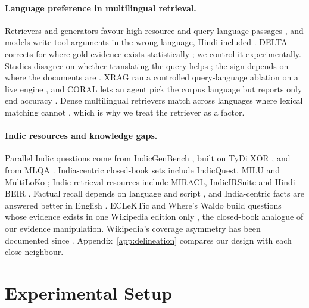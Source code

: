 \paragraph{Language preference in multilingual retrieval.} Retrievers and generators favour high-resource and query-language passages \citep{a2502_11175,a2604_20199,a2605_07249,a2509_13930}, and models write tool arguments in the wrong language, Hindi included \citep{a2601_05366}. DELTA corrects for where gold evidence exists statistically \citep{a2601_02956}; we control it experimentally. Studies disagree on whether translating the query helps \citep{a2504_03616,a2510_23070,a2507_22923}; the sign depends on where the documents are \citep{a2507_07543}. XRAG ran a controlled query-language ablation on a live engine \citep{a2505_10089}, and CORAL lets an agent pick the corpus language but reports only end accuracy \citep{a2604_25676}. Dense multilingual retrievers match across languages where lexical matching cannot \citep{a2511_19324,a2402_03216}, which is why we treat the retriever as a factor.

\paragraph{Indic resources and knowledge gaps.} Parallel Indic questions come from IndicGenBench \citep{a2404_16816}, built on TyDi XOR \citep{a2010_11856,clark2020tydi}, and from MLQA \citep{a1910_07475}. India-centric closed-book sets include IndicQuest, MILU and MultiLoKo \citep{a2608_15535,a2504_20022,a2411_02538,a2504_10356}; Indic retrieval resources include MIRACL, IndicIRSuite and Hindi-BEIR \citep{a2210_09984,a2312_09508,a2408_09437}. Factual recall depends on language and script \citep{a2010_06189,a2406_16135,a2510_15551}, and India-centric facts are answered better in English \citep{a2504_20022,a2605_29637}. ECLeKTic and Where's Waldo build questions whose evidence exists in one Wikipedia edition only \citep{a2502_21228,a2610_00606}, the closed-book analogue of our evidence manipulation. Wikipedia's coverage asymmetry has been documented since \citet{hecht2010tower}. Appendix~\ref{app:delineation} compares our design with each close neighbour.

\section{Experimental Setup}
\label{sec:setup}

